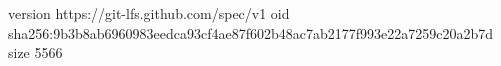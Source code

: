 version https://git-lfs.github.com/spec/v1
oid sha256:9b3b8ab6960983eedca93cf4ae87f602b48ac7ab2177f993e22a7259c20a2b7d
size 5566
